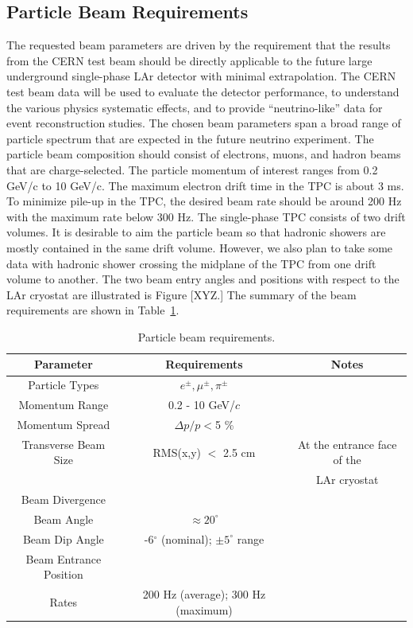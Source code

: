 
\subsection{Particle Beam Requirements}
The requested beam parameters are driven by the requirement that the results from the CERN test beam should be directly applicable to the future large underground single-phase LAr detector with minimal extrapolation. The CERN test beam data will be used to evaluate the detector performance, to understand the various physics systematic effects, and to provide ``neutrino-like'' data for event reconstruction studies. The chosen beam parameters span a broad range of particle spectrum that are expected in the future neutrino experiment. The particle beam composition should consist of electrons, muons, and hadron beams that are charge-selected. The particle momentum of interest ranges from 0.2 GeV/c to 10 GeV/c. The maximum electron drift time in the TPC is about 3 ms. To minimize pile-up in the TPC, the desired beam rate should be around 200 Hz with the maximum rate below 300 Hz. The single-phase TPC consists of two drift volumes. It is desirable to aim the particle beam so that hadronic showers are mostly contained in the same drift volume.  However, we also plan to take some data with hadronic shower crossing the midplane of the TPC from one drift volume to another.  The two beam entry angles and positions with respect to the LAr cryostat are illustrated is Figure [XYZ.] The summary of the beam requirements are shown in Table~\ref{table:beamspecs}.

\begin{table}[h]
\centering
\caption{Particle beam requirements.}
\label{table:beamspecs}
\begin{tabular}{|c|c|c|}
\hline
\textbf{Parameter } & \textbf{Requirements} & \textbf{Notes}  \\ \hline
  Particle Types        & $e^\pm,\mu^\pm,\pi^\pm$          &                   \\ \hline
  Momentum Range   & 0.2 - 10 GeV/$c$  &   \\ \hline
  Momentum Spread   & $\Delta p/p  < $5 \%  &   \\ \hline
  Transverse Beam Size   & RMS(x,y) $<$ 2.5 cm &  At the entrance face of the \\ 
                                              &                                        & LAr cryostat \\ \hline
  Beam Divergence &   &   \\ \hline
  Beam Angle &  $\approx20^{\circ}$  &   \\ \hline
  Beam Dip Angle &  -6$^\circ$ (nominal); $\pm5^\circ$ range &   \\ \hline
  Beam Entrance Position &   &   \\ \hline
  Rates & 200 Hz (average); 300 Hz (maximum)  &   \\ \hline
\end{tabular}
\end{table}


